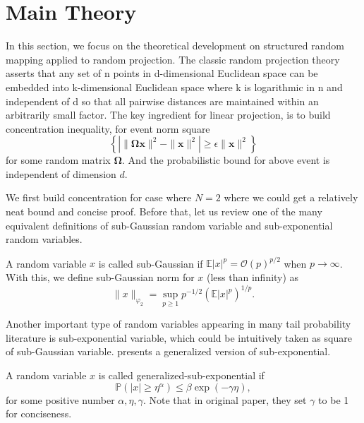 \section{Main Theory}
In this section, we focus on the theoretical development on structured random mapping applied to random projection.  The classic random projection 
theory asserts that any set of n points in d-dimensional Euclidean space can be
embedded into k-dimensional Euclidean space where k is
logarithmic in n and independent of d \textendash so that all pairwise
distances are maintained within an arbitrarily small factor. The key ingredient for linear projection, is to build concentration inequality, for event  norm square 
\begin{equation}
\left\{\left|\|\mathbf{\Omega} \mathbf{x}\|^2 -\|\mathbf{x}\|^2\right|\ge \epsilon \|\mathbf{x}\|^2\right\}
\end{equation}
for some random matrix $\mathbf{\Omega}$. And the probabilistic bound for above event is independent of dimension $d$. 

We first build concentration for case where $N=2$ where we could get a relatively neat bound and concise proof.  Before that, let us review one of the many equivalent definitions of sub-Gaussian random variable and sub-exponential random variables. 

\begin{definition}
\label{def:sub-gaussian}
A random variable $x$ is called sub-Gaussian if $\mathbb{E} |x|^p = \mathcal{O}(p)^{p/2}$ when $p\rightarrow \infty$. With this, we define sub-Gaussian norm for $x$ (less than infinity) as 
\begin{equation}
\|x\|_{\varphi_2} = \sup_{p\ge 1} p^{-1/2} (\mathbb{E} |x|^p)^{1/p}. 
\end{equation}
\end{definition}


Another important type of random variables appearing in many tail probability literature is sub-exponential variable, which could be intuitively taken as square of sub-Gaussian variable. \cite{buhler2002finding} presents a generalized version of sub-exponential.
\begin{definition}
\label{def:sub-exponential}
A random variable $x$ is called generalized-sub-exponential if 
\begin{equation}
\mathbb{P}(|x|\ge \eta^\alpha) \le \beta\exp(-\gamma \eta),  
\end{equation}	
for some positive number $\alpha, \eta, \gamma$.  Note that in original paper, they set $\gamma$ to be 1 for conciseness. 
\end{definition}


